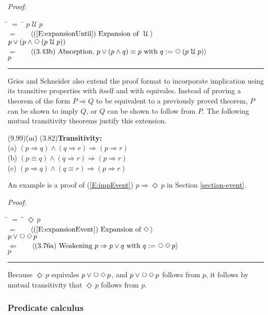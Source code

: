 \documentclass[12pt, fleqn, leqno]{article}
\newcommand{\lgap}{2pt}                             %
\newcommand{\mymathindent}{24pt}                    %
\newcommand{\impl}{\ensuremath{\Rightarrow}}        %
\newcommand{\foll}{\ensuremath{\Leftarrow}}         %
\newcommand{\Until}{\;\mathcal{U}\;}
\newcommand{\Next}{\;\,\text{\raisebox{3.5pt}{\circle{6}}}}
\newcommand{\Event}{\Diamond\,}
\newcommand{\myqed}{\rule[-.23ex]{1.2ex}{2.0ex}}
\newcommand{\myqedtab}{\hspace{384pt}}              %
\newcommand{\Gll} {\langle}                         %
\newcommand{\Ggg} {\rangle}                         %
\newcommand{\Hint}[1]     {\ \ \ $\Gll              \mbox{#1} \Ggg$ }   %
\begin{document}
\emph{Proof}:
\begin{tabbing}
\hspace{\mymathindent} \= $= \;$ \= \kill
  \> \>   $p \Until p$\\[\lgap]
  \> $=$  \>  \Hint{(\ref{E:expansionUntil}) Expansion of $\Until$}\\[\lgap]
  \> \>   $p \lor (p \land \Next(p \Until p))$\\[\lgap]
  \> $=$  \>  \Hint{(3.43b) Absorption, $p \lor (p \land q) \equiv p$ with $q := \Next (p \Until p)$}\\[\lgap]
  \> \>   $p$ \quad \myqed
\end{tabbing}

Gries and Schneider also extend the proof format to incorporate implication using its transitive properties
with itself and with equivales.
Instead of proving a theorem of the form $P\impl Q$ to be equivalent to a previously proved theorem,
$P$ can be shown to imply $Q$, or $Q$ can be shown to follow from $P$.
The following mutual transitivity theorems justify this extension.
\begin{tabbing}
(9.99)\;\=(m)\;\=\kill
(3.82)\>\textbf{Transitivity:}\\
      \> (a)\> $(p\impl q) \land (q\impl r) \impl (p\impl r)$\\[\lgap]
      \> (b)\> $(p\equiv q) \land (q\impl r) \impl (p\impl r)$\\[\lgap]
      \> (c)\> $(p\impl q) \land (q\equiv r) \impl (p\impl r)$
\end{tabbing}
An example is a proof of (\ref{E:impEvent}) $p \impl \Event p$ in Section \ref{section-event}.

\emph{Proof}:
\begin{tabbing}
\hspace{\mymathindent} \= $= \;$ \= \myqedtab \= \kill
  \> \>   $\Event p$\\[\lgap]
  \> $=$  \>  \Hint{(\ref{E:expansionEvent}) Expansion of $\Event$}\\[\lgap]
  \> \>   $p \lor \Next\Event p$\\[\lgap]
  \> $\foll$  \>  \Hint{(3.76a) Weakening $p\impl p\lor q$ with $q:=\Next\Event p$}\\[\lgap]
  \> \>   $p$ \quad \myqed
\end{tabbing}
Because $\Event p$ equivales $p \lor \Next\Event p$, and $p \lor \Next\Event p$ follows from $p$, it follows by
mutual transitivity that $\Event p$ follows from $p$.

\subsubsection*{Predicate calculus}
\end{document}

